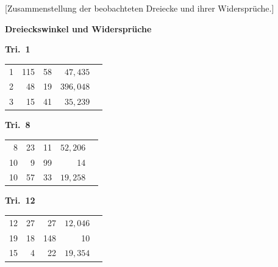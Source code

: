 \documentclass[12pt,a4paper]{article}
\theoremstyle{plain}
\theoremstyle{definition}
\theoremstyle{remark}
\begin{document}
[Zusammenstellung der beobachteten Dreiecke und ihrer Widerspr\"uche.]

\small
\begin{center}
\textbf{Dreieckswinkel und Widerspr\"uche}

\medskip

\medskip
\noindent
\begin{minipage}[t]{0.32\textwidth}
\centering
\textbf{Tri.~1}
\begin{tabular}[t]{r|r|r|r|l}
  1 & 115 & 58 & $47{,}435$ \\
  2 & 48 & 19 & $396{,}048$ \\
  3 & 15 & 41 & $35{,}239$ \\
\end{tabular}
\end{minipage}\hfill
\begin{minipage}[t]{0.32\textwidth}
\centering
\textbf{Tri.~8}
\begin{tabular}[t]{r|r|r|r|l}
  8 & 23 & 11 & $52{,}206$ \\
  10 & 9 & 99 & 14 \\
  10 & 57 & 33 & $19{,}258$ \\
\end{tabular}
\end{minipage}\hfill
\begin{minipage}[t]{0.32\textwidth}
\centering
\textbf{Tri.~12}
\begin{tabular}[t]{r|r|r|r|l}
  12 & 27 & 27 & $12{,}046$ \\
  19 & 18 & 148 & 10 \\
  15 & 4 & 22 & $19{,}354$ \\
\end{tabular}
\end{minipage}


\end{center}
\end{document}
